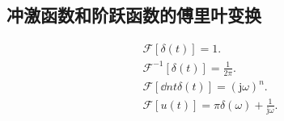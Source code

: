 \subsection{冲激函数和阶跃函数的傅里叶变换} \label{3 冲激函数和阶跃函数的傅里叶变换}
\rmg
\begin{gather}
    \mathcal{F}[\delta(t)]=1. \\
    \mathcal{F}^{-1}[\delta(t)]=\frac{1}{2\pi}. \label{eq:3.5 F-1 delta} \\
    \mathcal{F}\left[\dd{n}{t}\delta(t)\right]=(\mathrm{j}\omega)^n. \\
    \mathcal{F}[u(t)]=\pi\delta(\omega)+\frac{1}{\mathrm{j}\omega}.
\end{gather}
